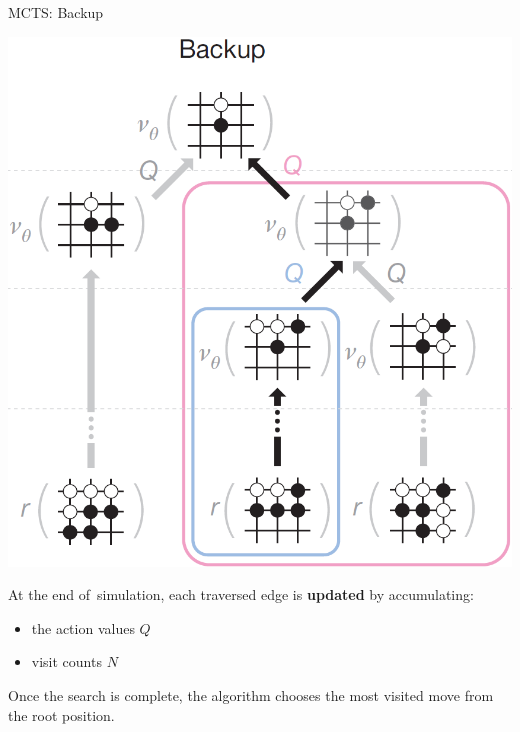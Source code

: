 \documentclass{beamer}
\begin{document}
{    \begin{frame}{MCTS: Backup}
      \begin{center}
        \includegraphics[height=.6\textheight]{../img/MCTS_backup.png}
      \end{center}
      
      \tiny
      At the end of~simulation, each traversed edge is \textbf{updated} by accumulating:
        \begin{itemize}[<+- | alert@+>]
          \item the action values $Q$
          \item visit counts $N$
        \end{itemize}
    \end{frame}

    \begin{frame}[standout]
      Once the search is complete, the algorithm chooses \alert{the most visited move} from the root position.
    \end{frame}

}
\end{document}
